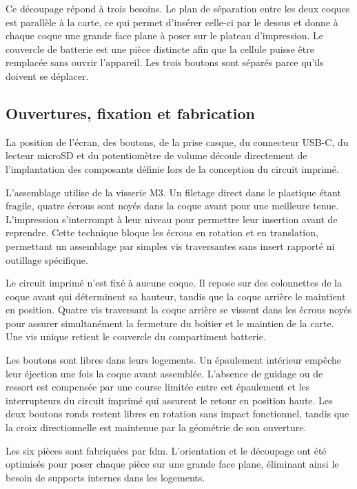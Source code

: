 Ce découpage répond à trois besoins. Le plan de séparation entre les deux coques est parallèle à la carte, ce qui permet d'insérer celle-ci par le dessus et donne à chaque coque une grande face plane à poser sur le plateau d'impression. Le couvercle de batterie est une pièce distincte afin que la cellule puisse être remplacée sans ouvrir l'appareil. Les trois boutons sont séparés parce qu'ils doivent se déplacer.

\subsection{Ouvertures, fixation et fabrication}

La position de l'écran, des boutons, de la prise casque, du connecteur USB-C, du lecteur microSD et du potentiomètre de volume découle directement de l'implantation des composants définie lors de la conception du circuit imprimé.

L'assemblage utilise de la visserie M3. Un filetage direct dans le plastique étant fragile, quatre écrous sont noyés dans la coque avant pour une meilleure tenue. L'impression s'interrompt à leur niveau pour permettre leur insertion avant de reprendre. Cette technique bloque les écrous en rotation et en translation, permettant un assemblage par simples vis traversantes sans insert rapporté ni outillage spécifique.

Le circuit imprimé n'est fixé à aucune coque. Il repose sur des colonnettes de la coque avant qui déterminent sa hauteur, tandis que la coque arrière le maintient en position. Quatre vis traversant la coque arrière se vissent dans les écrous noyés pour assurer simultanément la fermeture du boîtier et le maintien de la carte. Une vis unique retient le couvercle du compartiment batterie.

Les boutons sont libres dans leurs logements. Un épaulement intérieur empêche leur éjection une fois la coque avant assemblée. L'absence de guidage ou de ressort est compensée par une course limitée entre cet épaulement et les interrupteurs du circuit imprimé qui assurent le retour en position haute. Les deux boutons ronds restent libres en rotation sans impact fonctionnel, tandis que la croix directionnelle est maintenue par la géométrie de son ouverture.

Les six pièces sont fabriquées par \gls{fdm}. L'orientation et le découpage ont été optimisés pour poser chaque pièce sur une grande face plane, éliminant ainsi le besoin de supports internes dans les logements.

